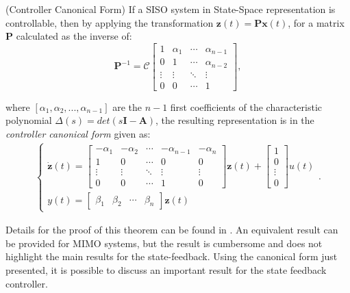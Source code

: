 \documentclass[a4paper,11pt]{book}
\numberwithin{figure}{chapter}
\numberwithin{equation}{chapter}
\numberwithin{table}{chapter}
\newtheorem{theorem}{Theorem}[chapter]
\theoremstyle{definition}
\newcounter{boxed-theorem}
\newenvironment{boxed-theorem}[1]
{\colorlet{shadecolor}{pastelBlue2!5} \begin{shaded} \begin{theorem}{#1}}
{\end{theorem} \end{shaded}}
\newcounter{boxed-lemma}
\newcounter{boxed-definition}
\newcounter{boxed-example}
\begin{document}
\begin{boxed-theorem}{(Controller Canonical Form)} \label{th:controlCanon}
    If a SISO system in State-Space representation is controllable, then by applying the transformation $\bm{z}(t) = \bm{P}\bm{x}(t)$, for a matrix $\bm{P}$ calculated as the inverse of:
    \begin{equation}
        \bm{P}^{-1} = \bm{\mathcal{C}} \begin{bmatrix}
        1 & \alpha_1 & \cdots  & \alpha_{n-1} \\
        0 & 1 & \cdots & \alpha_{n-2} \\
        \vdots & \vdots & \ddots & \vdots \\
        0 & 0 & \cdots &1
        \end{bmatrix}
    ,\end{equation}
    
    \noindent where $[\alpha_1, \alpha_2, ..., \alpha_{n-1}]$ are the $n-1$ first coefficients of the characteristic polynomial $\Delta(s) = det(s\bm{I} - \bm{A})$, the resulting representation is in the \textit{controller canonical form} given as:
    \begin{align}
    \begin{cases}
        \dot{\bm{z}}(t) = \begin{bmatrix}
            -\alpha_1 & -\alpha_2 & \cdots & -\alpha_{n-1} & -\alpha_n \\
            1 & 0 & \cdots & 0 & 0 \\
            \vdots & \vdots & \ddots & \vdots & \vdots \\
            0 & 0 & \cdots & 1 & 0 
        \end{bmatrix} \bm{z}(t) + \begin{bmatrix}
            1 \\ 0 \\ \vdots \\ 0
        \end{bmatrix} u(t) \\
        y(t) = \begin{bmatrix} \beta_1 & \beta_2 & \cdots & \beta_n \end{bmatrix} \bm{z}(t)
    \end{cases}
    .\end{align}
\end{boxed-theorem} 

Details for the proof of this theorem can be found in \cite{Chen:1998}. An equivalent result can be provided for MIMO systems, but the result is cumbersome and does not highlight the main results for the state-feedback. Using the canonical form just presented, it is possible to discuss an important result for the state feedback controller.
\end{document}
